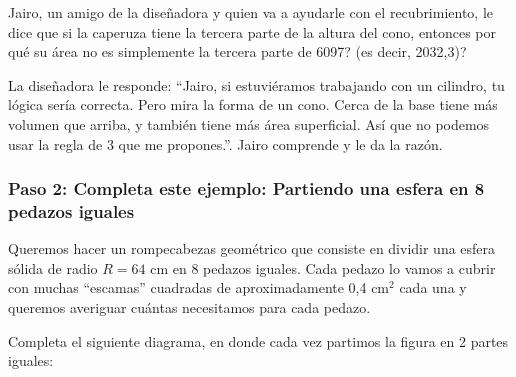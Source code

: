 \documentclass[12pt,a4paper]{article}
\begin{document}
Jairo, un amigo de la diseñadora y quien va a ayudarle con el recubrimiento, le dice que si la caperuza tiene la tercera parte de la altura del cono, entonces por qué su área no es simplemente la tercera parte de 6097? (es decir, 2032,3)?

La diseñadora le responde: ``Jairo, si estuviéramos trabajando con un cilindro, tu lógica sería correcta. Pero mira la forma de un cono. Cerca de la base tiene más volumen que arriba, y también tiene más área superficial. Así que no podemos usar la regla de 3 que me propones.''. Jairo comprende y le da la razón.

\vspace{4mm}


\subsubsection*{Paso 2: Completa este ejemplo: Partiendo una esfera en 8 pedazos iguales}

Queremos hacer un rompecabezas geométrico que consiste en dividir una esfera sólida de radio $R = 64$ cm en 8 pedazos iguales. Cada pedazo lo vamos a cubrir con muchas ``escamas'' cuadradas de aproximadamente 0,4 cm$^2$ cada una y queremos averiguar cuántas necesitamos para cada pedazo.

Completa el siguiente diagrama, en donde cada vez partimos la figura en 2 partes iguales:
\end{document}
